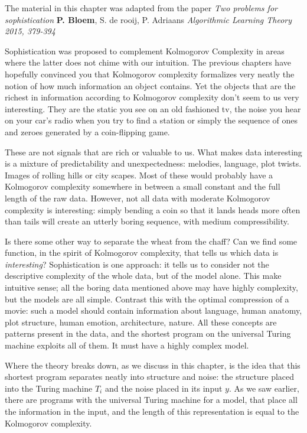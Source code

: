 \begin{summary}
The material in this chapter was adapted from the paper \emph{Two problems for sophistication} \textbf{P. Bloem}, S. de rooij, P. Adriaans \emph{Algorithmic Learning Theory 2015, 379-394}
\end{summary}

Sophistication was proposed to complement Kolmogorov Complexity in areas where the latter does not chime with our intuition. The previous chapters have hopefully convinced you that Kolmogorov complexity formalizes very neatly the notion of how much information an object contains. Yet the objects that are the richest in information according to Kolmogorov complexity don't seem to us very interesting. They are the static you see on an old fashioned tv, the noise you hear on your car's radio when you try to find a station or simply the sequence of ones and zeroes generated by a coin-flipping game. 


These are not signals that are rich or valuable to us. What makes data interesting is a mixture of predictability and unexpectedness: melodies, language, plot twists. Images of rolling hills or city scapes. Most of these would probably have a Kolmogorov complexity somewhere in between a small constant and the full length of the raw data. However, not all data with moderate Kolmogorov complexity is interesting: simply bending a coin so that it lands heads more often than tails will create an utterly boring sequence, with medium compressibility. 

Is there some other way to separate the wheat from the chaff? Can we find some function, in the spirit of Kolmogorov complexity, that tells us which data is \emph{interesting}? Sophistication is one approach: it tells us to consider not the descriptive complexity of the whole data, but of the model alone. This make intuitive sense; all the boring data mentioned above may have highly complexity, but the models are all simple. Contrast this with the optimal compression of a movie: such a model should contain information about language, human anatomy, plot structure, human emotion, architecture, nature. All these concepts are patterns present in the data, and the shortest program on the universal Turing machine exploits all of them. It must have a highly complex model.    
  
Where the theory breaks down, as we discuss in this chapter, is the idea that this shortest program separates neatly into structure and noise: the structure placed into the Turing machine $T_i$ and the noise placed in its input $y$. As we saw earlier, there are programs with the universal Turing machine for a model, that place all the information in the input, and the length of this representation is equal to the Kolmogorov complexity.
 
